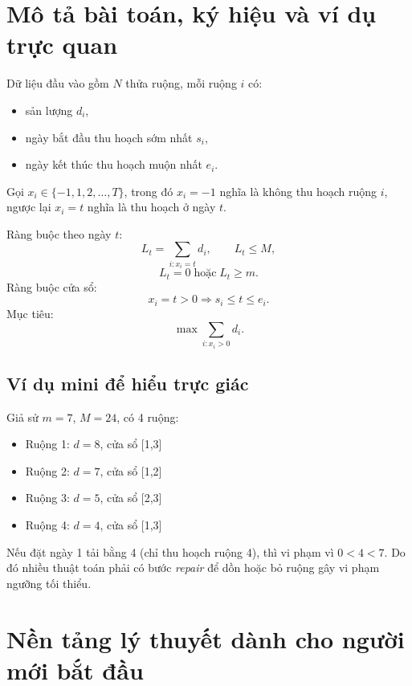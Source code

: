 \documentclass[12pt,a4paper]{article}
\begin{document}
\section{Mô tả bài toán, ký hiệu và ví dụ trực quan}
Dữ liệu đầu vào gồm $N$ thửa ruộng, mỗi ruộng $i$ có:
\begin{itemize}
  \item sản lượng $d_i$,
  \item ngày bắt đầu thu hoạch sớm nhất $s_i$,
  \item ngày kết thúc thu hoạch muộn nhất $e_i$.
\end{itemize}

Gọi $x_i \in \{-1,1,2,\dots,T\}$, trong đó $x_i=-1$ nghĩa là không thu hoạch ruộng $i$, ngược lại $x_i=t$ nghĩa là thu hoạch ở ngày $t$.

Ràng buộc theo ngày $t$:
\begin{equation}
L_t = \sum_{i: x_i=t} d_i,\qquad L_t \le M,
\end{equation}
\begin{equation}
L_t=0\;\text{hoặc}\;L_t\ge m.
\end{equation}
Ràng buộc cửa sổ:
\begin{equation}
x_i=t>0 \Rightarrow s_i \le t \le e_i.
\end{equation}
Mục tiêu:
\begin{equation}
\max \sum_{i: x_i>0} d_i.
\end{equation}

\subsection{Ví dụ mini để hiểu trực giác}
Giả sử $m=7$, $M=24$, có 4 ruộng:
\begin{itemize}
  \item Ruộng 1: $d=8$, cửa sổ [1,3]
  \item Ruộng 2: $d=7$, cửa sổ [1,2]
  \item Ruộng 3: $d=5$, cửa sổ [2,3]
  \item Ruộng 4: $d=4$, cửa sổ [1,3]
\end{itemize}
Nếu đặt ngày 1 tải bằng 4 (chỉ thu hoạch ruộng 4), thì vi phạm vì $0 < 4 < 7$.
Do đó nhiều thuật toán phải có bước \textit{repair} để dồn hoặc bỏ ruộng gây vi phạm ngưỡng tối thiểu.

\section{Nền tảng lý thuyết dành cho người mới bắt đầu}
\end{document}
